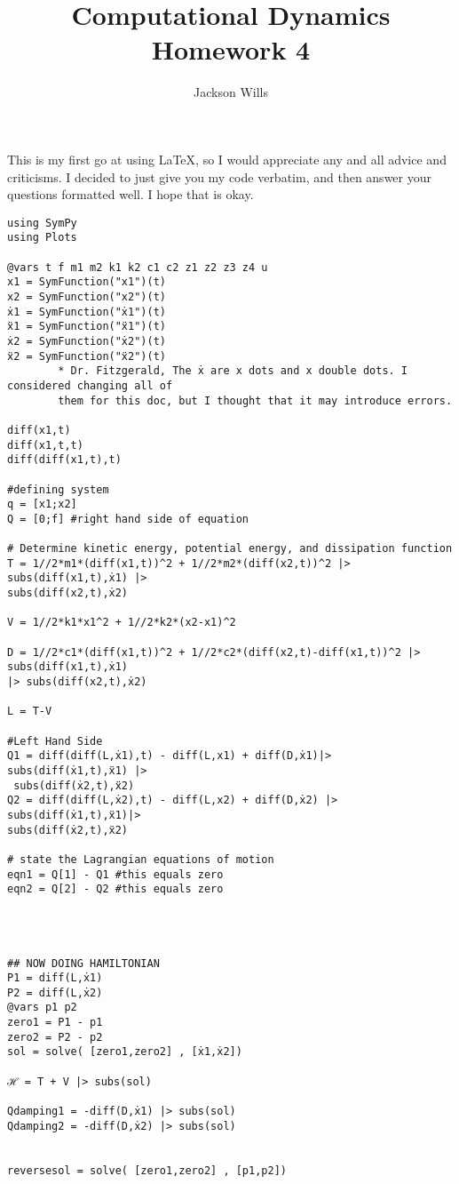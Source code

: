 \documentclass[12pt]{article}
\title{Computational Dynamics Homework 4}
\author{Jackson Wills}
\begin{document}
\maketitle

This is my first go at using LaTeX, so I would appreciate any and all advice and criticisms.
I decided to just give you my code verbatim, and then answer your questions formatted well. I hope that is okay.



\begin{verbatim}
using SymPy
using Plots

@vars t f m1 m2 k1 k2 c1 c2 z1 z2 z3 z4 u
x1 = SymFunction("x1")(t)
x2 = SymFunction("x2")(t)
ẋ1 = SymFunction("ẋ1")(t)
ẍ1 = SymFunction("ẍ1")(t)
ẋ2 = SymFunction("ẋ2")(t)
ẍ2 = SymFunction("ẍ2")(t)
		* Dr. Fitzgerald, The ẋ are x dots and x double dots. I considered changing all of 
		them for this doc, but I thought that it may introduce errors.

diff(x1,t)
diff(x1,t,t)
diff(diff(x1,t),t)

#defining system
q = [x1;x2]
Q = [0;f] #right hand side of equation

# Determine kinetic energy, potential energy, and dissipation function
T = 1//2*m1*(diff(x1,t))^2 + 1//2*m2*(diff(x2,t))^2 |> subs(diff(x1,t),ẋ1) |> 
subs(diff(x2,t),ẋ2)

V = 1//2*k1*x1^2 + 1//2*k2*(x2-x1)^2

D = 1//2*c1*(diff(x1,t))^2 + 1//2*c2*(diff(x2,t)-diff(x1,t))^2 |> subs(diff(x1,t),ẋ1) 
|> subs(diff(x2,t),ẋ2)

L = T-V

#Left Hand Side
Q1 = diff(diff(L,ẋ1),t) - diff(L,x1) + diff(D,ẋ1)|> subs(diff(ẋ1,t),ẍ1) |>
 subs(diff(ẋ2,t),ẍ2)
Q2 = diff(diff(L,ẋ2),t) - diff(L,x2) + diff(D,ẋ2) |> subs(diff(ẋ1,t),ẍ1)|> 
subs(diff(ẋ2,t),ẍ2)

# state the Lagrangian equations of motion
eqn1 = Q[1] - Q1 #this equals zero
eqn2 = Q[2] - Q2 #this equals zero




## NOW DOING HAMILTONIAN
P1 = diff(L,ẋ1)
P2 = diff(L,ẋ2)
@vars p1 p2
zero1 = P1 - p1
zero2 = P2 - p2
sol = solve( [zero1,zero2] , [ẋ1,ẋ2])

ℋ = T + V |> subs(sol)

Qdamping1 = -diff(D,ẋ1) |> subs(sol)
Qdamping2 = -diff(D,ẋ2) |> subs(sol)


reversesol = solve( [zero1,zero2] , [p1,p2])


\end{verbatim}
\end{document}
